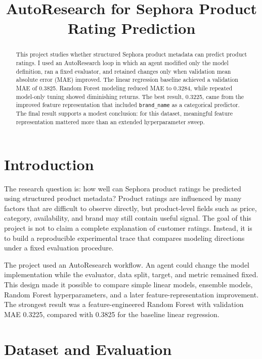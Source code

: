 \title{AutoResearch for Sephora Product Rating Prediction}

\maketitle

\begin{abstract}
This project studies whether structured Sephora product metadata can predict product ratings. I used an AutoResearch loop in which an agent modified only the model definition, ran a fixed evaluator, and retained changes only when validation mean absolute error (MAE) improved. The linear regression baseline achieved a validation MAE of 0.3825. Random Forest modeling reduced MAE to 0.3284, while repeated model-only tuning showed diminishing returns. The best result, 0.3225, came from the improved feature representation that included \texttt{brand\_name} as a categorical predictor. The final result supports a modest conclusion: for this dataset, meaningful feature representation mattered more than an extended hyperparameter sweep.
\end{abstract}

\section{Introduction}

The research question is: how well can Sephora product ratings be predicted using structured product metadata? Product ratings are influenced by many factors that are difficult to observe directly, but product-level fields such as price, category, availability, and brand may still contain useful signal. The goal of this project is not to claim a complete explanation of customer ratings. Instead, it is to build a reproducible experimental trace that compares modeling directions under a fixed evaluation procedure.

The project used an AutoResearch workflow. An agent could change the model implementation while the evaluator, data split, target, and metric remained fixed. This design made it possible to compare simple linear models, ensemble models, Random Forest hyperparameters, and a later feature-representation improvement. The strongest result was a feature-engineered Random Forest with validation MAE 0.3225, compared with 0.3825 for the baseline linear regression.

\section{Dataset and Evaluation}

